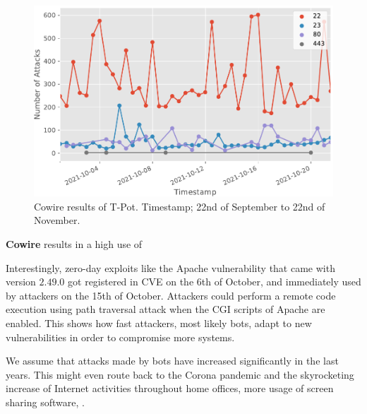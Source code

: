 \begin{figure}[ht]
    \centering
    \includegraphics[width=\textwidth]{figures/tpot-cowire-port.pdf}
    \caption[Cowire results of T-Pot]{Cowire results of T-Pot. Timestamp; 22nd of September to 22nd of November.}
    \label{fig:cowire-results}
\end{figure}

\textbf{Cowire} results in a high use of 

Interestingly, zero-day exploits like the Apache vulnerability \cite{CVE-2021-42013} that came with version $2.49.0$ got registered in CVE on the 6th of October, and immediately used by attackers on the 15th of October.
Attackers could perform a remote code execution using path traversal attack when the CGI scripts of Apache are enabled.
This shows how fast attackers, most likely bots, adapt to new vulnerabilities in order to compromise more systems.


We assume that attacks made by bots have increased significantly in the last years.
This might even route back to the Corona pandemic and the skyrocketing increase of Internet activities throughout home offices, more usage of screen sharing software, .


